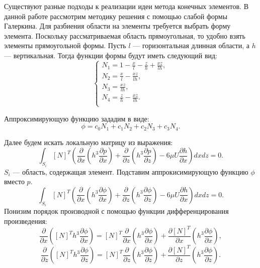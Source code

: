 \documentclass[a4paper,14pt]{extarticle}
\begin{document}
Существуют разные подходы к реализации идеи метода конечных элементов. В данной работе рассмотрим методику решения с помощью слабой формы Галеркина. Для разбиения области на элементы требуется выбрать форму элемента. Поскольку рассматриваемая область прямоугольная, то удобно взять элементы прямоугольной формы. Пусть $l$ --- горизонтальная длинная области, а $h$ --- вертикальная. Тогда функции формы будут иметь следующий вид:
\begin{equation}
	\begin{cases}
		N_1 = 1 - \frac{x}{l} - \frac{z}{h} + \frac{x  z}{l  h}, \\
		N_2 = \frac{x}{l} - \frac{x  z}{l  h}, \\
		N_3 = \frac{x  z}{l h}, \\
		N_4 = \frac{z}{h} - \frac{x  z}{l  h}. \\
	\end{cases}
\label{form-func}
\end{equation}

Аппроксимирующую функцию зададим в виде:
\begin{equation*}
	\phi = c_0 N_1 + c_1 N_2 + c_2 N_3 + c_3 N_4.
\end{equation*}

Далее будем искать локальную матрицу из выражения:
\begin{equation}
	\label{init_eq}
	\int_{S_i} {[N]^T \left(\frac{\partial}{\partial x} \left(h^3 \frac{\partial p}{\partial x} \right) + \frac{\partial}{\partial z} \left(h^3 \frac{\partial p}{\partial z} \right) - 6 \mu U \frac{\partial h}{\partial x}\right) dx dz} = 0.
\end{equation}
$S_i$ --- область, содержащая элемент. 
Подставим аппрокисимирующую функцию $\phi$ вместо $p$.
\begin{equation*}
	\int_{S_i} {[N]^T \left(\frac{\partial}{\partial x} \left(h^3 \frac{\partial \phi}{\partial x} \right) + \frac{\partial}{\partial z} \left(h^3 \frac{\partial \phi}{\partial z} \right) - 6 \mu U \frac{\partial h}{\partial x}\right) dx dz} = 0.
\end{equation*}
Понизим порядок производной с помощью функции дифференцирования произведения:
\begin{equation*}
	 \frac{\partial}{\partial x} \left( [N]^T h^3 \frac{\partial \phi}{\partial x} \right)  = [N]^T \frac{\partial}{\partial x} \left(h^3 \frac{\partial \phi}{\partial x} \right) + \frac{\partial[N]^T}{\partial x} \left(h^3 \frac{\partial \phi}{\partial x} \right),
\end{equation*}
\begin{equation*}
	 \frac{\partial}{\partial z} \left( [N]^T h^3 \frac{\partial \phi}{\partial z} \right)  = [N]^T \frac{\partial}{\partial z} \left(h^3 \frac{\partial \phi}{\partial z} \right) + \frac{\partial[N]^T}{\partial z} \left(h^3 \frac{\partial \phi}{\partial z} \right).
\end{equation*}
\end{document}
